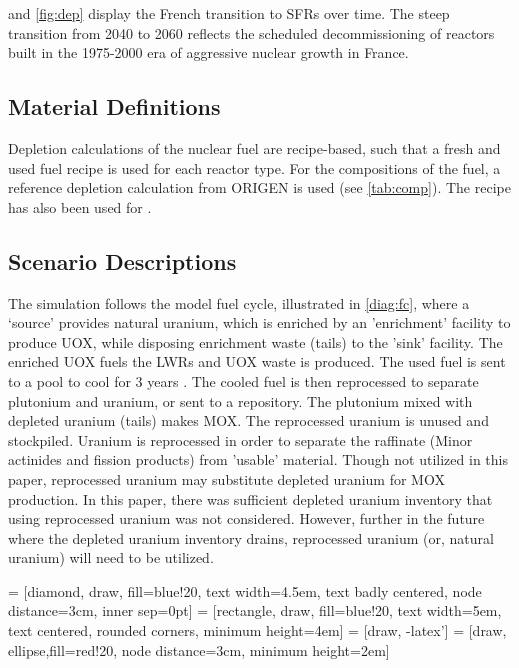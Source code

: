  and \cref{fig:dep} display
the French transition to \glspl{SFR} over time.
The steep transition from 2040 to 2060 reflects the scheduled
decommissioning of reactors built in the 1975-2000
era of aggressive nuclear growth in France.


\subsection{Material Definitions}
Depletion calculations of the nuclear fuel are recipe-based, such that a fresh 
and used fuel recipe is used for each reactor type.
For the compositions of the fuel, a reference depletion calculation
from ORIGEN is used (see \cref{tab:comp}). The recipe has also been used for
\cite{wilson_adoption_2009}.


\subsection{Scenario Descriptions}
The simulation follows the model fuel cycle, illustrated in \cref{diag:fc},
where a `source' provides natural uranium, which is enriched by an 'enrichment'
facility to produce \gls{UOX}, while disposing enrichment waste (tails)
to the 'sink' facility. The enriched \gls{UOX} fuels
the \gls{LWR}s and \gls{UOX} waste is produced. The used fuel
is sent to a pool to cool for 3 years \cite{carre_overview_2009}.
The cooled fuel is then reprocessed to separate plutonium and uranium,
or sent to a repository.
The plutonium mixed with depleted uranium (tails) makes \gls{MOX}.
The reprocessed uranium is unused and stockpiled. Uranium is reprocessed
in order to separate the raffinate (Minor actinides and fission products)
from 'usable' material. Though not utilized in this paper, reprocessed
uranium may substitute depleted uranium for \gls{MOX} production. In this
paper, there was sufficient depleted uranium inventory that using reprocessed
uranium was not considered. However, further in the future where the depleted
uranium inventory drains, reprocessed uranium (or, natural uranium) will need to be utilized. 


 = [diamond, draw, fill=blue!20, 
text width=4.5em, text badly centered, node distance=3cm, inner sep=0pt]
 = [rectangle, draw, fill=blue!20, 
text width=5em, text centered, rounded corners, minimum height=4em]
 = [draw, -latex']
 = [draw, ellipse,fill=red!20, node distance=3cm,
minimum height=2em]


